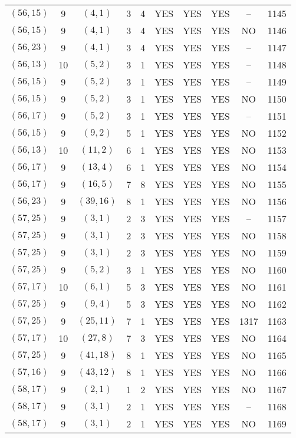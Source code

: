 \begin{longtable}{|c|c|c|c|c|c|c|c|c|c|}
$(56, 15)$ & 9 & $(4, 1)$ & 3 & 4 & YES & YES & YES & -- & 1145\\
$(56, 15)$ & 9 & $(4, 1)$ & 3 & 4 & YES & YES & YES & NO & 1146\\
$(56, 23)$ & 9 & $(4, 1)$ & 3 & 4 & YES & YES & YES & -- & 1147\\
$(56, 13)$ & 10 & $(5, 2)$ & 3 & 1 & YES & YES & YES & -- & 1148\\
$(56, 15)$ & 9 & $(5, 2)$ & 3 & 1 & YES & YES & YES & -- & 1149\\
$(56, 15)$ & 9 & $(5, 2)$ & 3 & 1 & YES & YES & YES & NO & 1150\\
$(56, 17)$ & 9 & $(5, 2)$ & 3 & 1 & YES & YES & YES & -- & 1151\\
$(56, 15)$ & 9 & $(9, 2)$ & 5 & 1 & YES & YES & YES & NO & 1152\\
$(56, 13)$ & 10 & $(11, 2)$ & 6 & 1 & YES & YES & YES & NO & 1153\\
$(56, 17)$ & 9 & $(13, 4)$ & 6 & 1 & YES & YES & YES & NO & 1154\\
$(56, 17)$ & 9 & $(16, 5)$ & 7 & 8 & YES & YES & YES & NO & 1155\\
$(56, 23)$ & 9 & $(39, 16)$ & 8 & 1 & YES & YES & YES & NO & 1156\\
$(57, 25)$ & 9 & $(3, 1)$ & 2 & 3 & YES & YES & YES & -- & 1157\\
$(57, 25)$ & 9 & $(3, 1)$ & 2 & 3 & YES & YES & YES & NO & 1158\\
$(57, 25)$ & 9 & $(3, 1)$ & 2 & 3 & YES & YES & YES & NO & 1159\\
$(57, 25)$ & 9 & $(5, 2)$ & 3 & 1 & YES & YES & YES & NO & 1160\\
$(57, 17)$ & 10 & $(6, 1)$ & 5 & 3 & YES & YES & YES & NO & 1161\\
$(57, 25)$ & 9 & $(9, 4)$ & 5 & 3 & YES & YES & YES & NO & 1162\\
$(57, 25)$ & 9 & $(25, 11)$ & 7 & 1 & YES & YES & YES & 1317 & 1163\\
$(57, 17)$ & 10 & $(27, 8)$ & 7 & 3 & YES & YES & YES & NO & 1164\\
$(57, 25)$ & 9 & $(41, 18)$ & 8 & 1 & YES & YES & YES & NO & 1165\\
$(57, 16)$ & 9 & $(43, 12)$ & 8 & 1 & YES & YES & YES & NO & 1166\\
$(58, 17)$ & 9 & $(2, 1)$ & 1 & 2 & YES & YES & YES & NO & 1167\\
$(58, 17)$ & 9 & $(3, 1)$ & 2 & 1 & YES & YES & YES & -- & 1168\\
$(58, 17)$ & 9 & $(3, 1)$ & 2 & 1 & YES & YES & YES & NO & 1169\\

\end{longtable}
